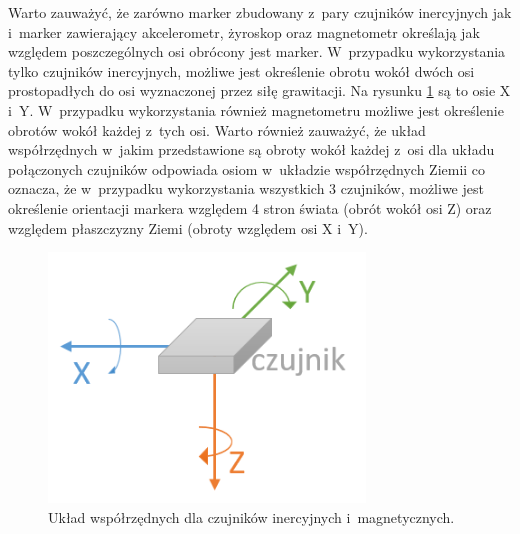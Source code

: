 Warto zauważyć, że zarówno marker zbudowany z~pary czujników inercyjnych jak i~marker zawierający akcelerometr, żyroskop oraz magnetometr określają jak względem poszczególnych osi obrócony jest marker. W~przypadku wykorzystania tylko czujników inercyjnych, możliwe jest określenie obrotu wokół dwóch osi prostopadłych do osi wyznaczonej przez siłę grawitacji. Na rysunku \ref{fig:literature:imu:coordination} są to osie X i~Y. W~przypadku wykorzystania również magnetometru możliwe jest określenie obrotów wokół każdej z~tych osi. Warto również zauważyć, że układ współrzędnych w~jakim przedstawione są obroty wokół każdej z~osi dla układu połączonych czujników odpowiada osiom w~układzie współrzędnych Ziemii co oznacza, że w~przypadku wykorzystania wszystkich 3 czujników, możliwe jest określenie orientacji markera względem 4 stron świata (obrót wokół osi Z) oraz względem płaszczyzny Ziemi (obroty względem osi X i~Y).

\begin{figure}[!htp]
	\centering	
	\includegraphics[width=0.75\textwidth]{images/IMUAxes.png}
	\caption{Układ współrzędnych dla czujników inercyjnych i~magnetycznych.}
	\label{fig:literature:imu:coordination}
\end{figure}

